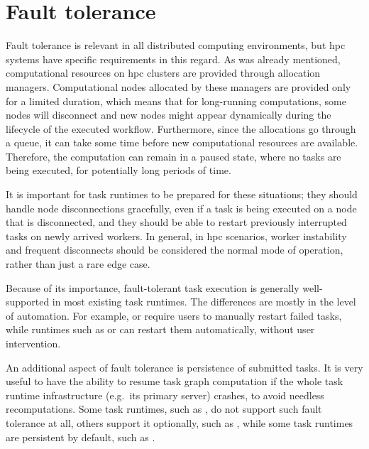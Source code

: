 \section{Fault tolerance}
Fault tolerance is relevant in all distributed computing environments, but \gls{hpc}
systems have specific requirements in this regard. As was already mentioned, computational
resources on \gls{hpc} clusters are provided through allocation managers.
Computational nodes allocated by these managers are provided only for a limited duration, which
means that for long-running computations, some nodes will disconnect and new nodes might appear
dynamically during the lifecycle of the executed workflow. Furthermore, since the allocations go
through a queue, it can take some time before new computational resources are available. Therefore,
the computation can remain in a paused state, where no tasks are being executed, for potentially
long periods of time.

It is important for task runtimes to be prepared for these situations; they should handle node
disconnections gracefully, even if a task is being executed on a node that is disconnected, and
they should be able to restart previously interrupted tasks on newly arrived workers. In general,
in \gls{hpc} scenarios, worker instability and frequent disconnects should be
considered the normal mode of operation, rather than just a rare edge case.

Because of its importance, fault-tolerant task execution is generally well-supported in most
existing task runtimes. The differences are mostly in the level of automation. For example,
\fireworks{} or \merlin{} require users to manually restart failed tasks,
while runtimes such as \dask{} or \balsam{} can restart them
automatically, without user intervention.

An additional aspect of fault tolerance is persistence of submitted tasks. It is very useful to
have the ability to resume task graph computation if the whole task runtime infrastructure (e.g.\
its primary server) crashes, to avoid needless recomputations. Some task runtimes, such as
\dask{}, do not support such fault tolerance at all, others support it optionally,
such as \ray{}, while some task runtimes are persistent by default, such as
\balsam{}.


